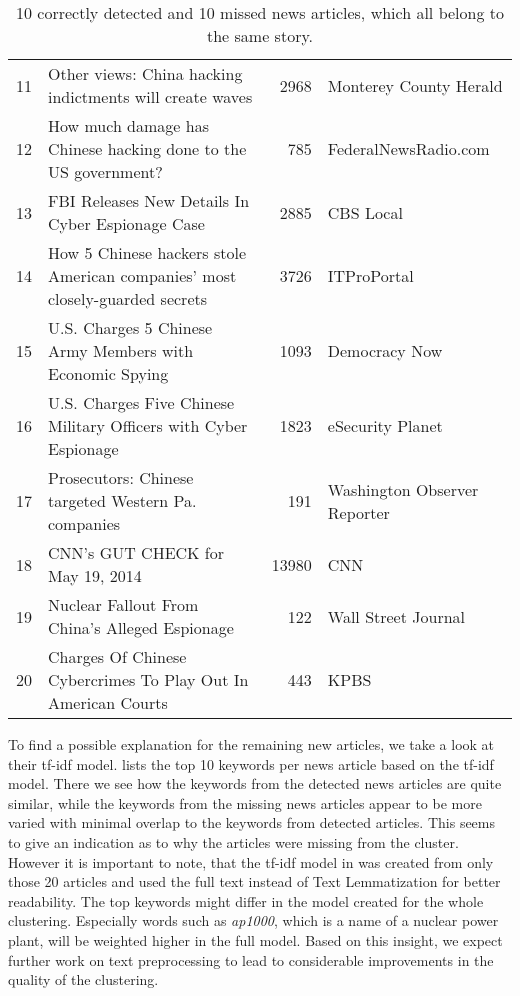 \begin{table}[h]
{\begin{tabular}{rlrl}
            \hline
                11 & Other views: China hacking indictments will create waves                     &          2968 & Monterey County Herald       \\
                12 & How much damage has Chinese hacking done to the US government?               &           785 & FederalNewsRadio.com         \\
                13 & FBI Releases New Details In Cyber Espionage Case                             &          2885 & CBS Local                    \\
                14 & How 5 Chinese hackers stole American companies' most closely-guarded secrets &          3726 & ITProPortal                  \\
                15 & U.S. Charges 5 Chinese Army Members with Economic Spying                     &          1093 & Democracy Now                \\
                16 & U.S. Charges Five Chinese Military Officers with Cyber Espionage             &          1823 & eSecurity Planet             \\
                17 & Prosecutors: Chinese targeted Western Pa. companies                          &           191 & Washington Observer Reporter \\
                18 & CNN's GUT CHECK for May 19, 2014                                             &         13980 & CNN                  \\
                19 & Nuclear Fallout From China's Alleged Espionage                               &           122 & Wall Street Journal \\
                20 & Charges Of Chinese Cybercrimes To Play Out In American Courts                &           443 & KPBS               \\
                \hline
        \end{tabular}
    }
    \caption{10 correctly detected and 10 missed news articles, which all belong to the same story.}
    \label{tab:clustering_example}
\end{table}

To find a possible explanation for the remaining new articles, we take a look at their tf-idf model.
 lists the top 10 keywords per news article based on the tf-idf model.
There we see how the keywords from the detected news articles are quite similar,
while the keywords from the missing news articles appear to be more varied
with minimal overlap to the keywords from detected articles.
This seems to give an indication as to why the articles were missing from the cluster.
However it is important to note, that the tf-idf model in 
was created from only those 20 articles and used the full text instead of Text Lemmatization for better readability.
The top keywords might differ in the model created for the whole clustering.
Especially words such as \textit{ap1000}, which is a name of a nuclear power plant,
will be weighted higher in the full model.
Based on this insight, we expect further work on text preprocessing
to lead to considerable improvements in the quality of the clustering.

